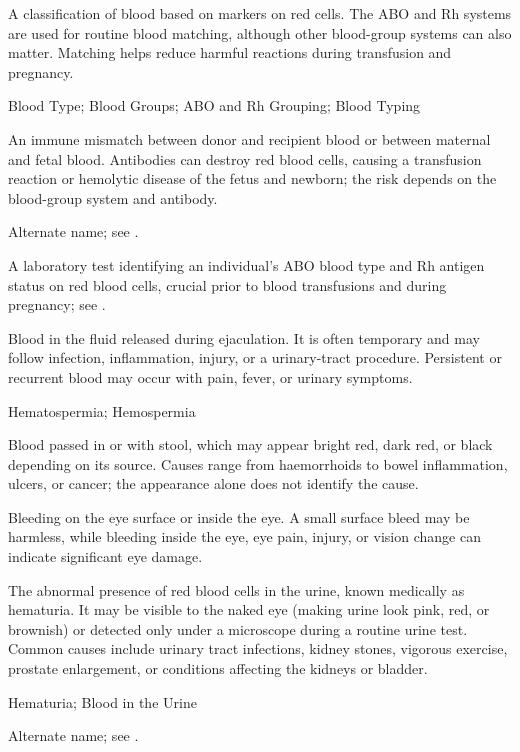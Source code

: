  A classification of blood based on markers on red
cells. The ABO and Rh systems are used for routine blood matching, although
other blood-group systems can also matter. Matching helps reduce harmful
reactions during transfusion and pregnancy.

\synonyms
Blood Type; Blood Groups; ABO and Rh Grouping; Blood Typing

 An immune mismatch between donor and recipient blood or between maternal and fetal blood. Antibodies can destroy red blood cells, causing a transfusion reaction or hemolytic disease of the fetus and newborn; the risk depends on the blood-group system and antibody.

 Alternate name; see .

 A laboratory test identifying an individual's ABO blood type and Rh antigen status on red blood cells, crucial prior to blood transfusions and during pregnancy; see .

 Blood in the fluid released during ejaculation. It is often temporary and may follow infection, inflammation, injury, or a urinary-tract procedure. Persistent or recurrent blood may occur with pain, fever, or urinary symptoms.

\synonyms
Hematospermia; Hemospermia

 Blood passed in or with stool, which may appear bright red, dark red, or black depending on its source. Causes range from haemorrhoids to bowel inflammation, ulcers, or cancer; the appearance alone does not identify the cause.

 Bleeding on the eye surface or inside the eye. A small surface bleed may be harmless, while bleeding inside the eye, eye pain, injury, or vision change can indicate significant eye damage.

 The abnormal presence of red blood cells in the urine, known medically as hematuria. It may be visible to the naked eye (making urine look pink, red, or brownish) or detected only under a microscope during a routine urine test. Common causes include urinary tract infections, kidney stones, vigorous exercise, prostate enlargement, or conditions affecting the kidneys or bladder.

\synonyms
Hematuria; Blood in the Urine

 Alternate name; see .

